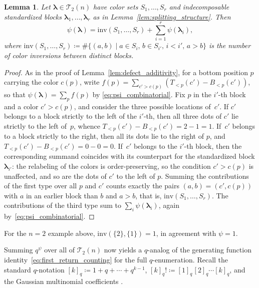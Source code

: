 \documentclass[10pt,a4paper]{amsart}
\numberwithin{equation}{section}
\newcommand{\ssp}{\hspace{1pt}}
\newtheorem{Lemma}[Theorem]{Lemma}
\theoremstyle{definition}
\begin{document}
\begin{Lemma}
	\label{lem:psi_crossterm}
	Let $\boldsymbol\lambda\in\mathcal{T}_2(n)$ have color sets
	$S_1,\dots,S_r$ and indecomposable standardized blocks
	$\boldsymbol\lambda_1,\dots,\boldsymbol\lambda_r$ as in
	Lemma~{\rm \ref{lem:splitting_structure}}.
	Then
	\begin{equation*}%
		\psi(\boldsymbol\lambda)
		=\mathrm{inv}(S_1,\dots,S_r)
		+\sum_{i=1}^{r}\psi(\boldsymbol\lambda_i),
	\end{equation*}
	where
	$\mathrm{inv}(S_1,\dots,S_r)
	\coloneqq
	\# \{(a,b)\mid a\in S_i,\, b\in S_{i'},\, i<i',\, a>b \}$
	is the number of color inversions between distinct blocks.
\end{Lemma}
\begin{proof}
	As in the proof of Lemma~\ref{lem:defect_additivity}, for a bottom position
	$p$ carrying the color $c(p)$, write
	$f(p)=\sum_{c'>c(p)} (T_{<p}(c')-B_{<p}(c') )$, so that
	$\psi(\boldsymbol\lambda)=\sum_{p}f(p)$ by
	\eqref{eq:psi_combinatorial}.
	Fix $p$ in the $i'$-th block and a color $c'>c(p)$, and consider the
	three possible locations of~$c'$.
	If $c'$ belongs to a block strictly to the left of the $i'$-th, then
	all three dots of $c'$ lie strictly to the left of~$p$, whence
	$T_{<p}(c')-B_{<p}(c')=2-1=1$.
	If~$c'$ belongs to a block strictly to the right, then all its dots
	lie to the right of $p$, and $T_{<p}(c')-B_{<p}(c')=0-0=0$.
	If~$c'$ belongs to the $i'$-th block, then the corresponding summand
	coincides with its counterpart for the standardized block
	$\boldsymbol\lambda_{i'}$: the relabeling of the colors is
	order-preserving, so the condition $c'>c(p)$ is unaffected, and so are
	the dots of $c'$ to the left of $p$.
	Summing the contributions of the first type over all $p$ and $c'$
	counts exactly the pairs $(a,b)=(c',c(p))$ with $a$ in an earlier
	block than $b$ and $a>b$, that is, $\mathrm{inv}(S_1,\dots,S_r)$.
	The contributions of the third type sum to
	$\sum_{i}\psi(\boldsymbol\lambda_i)$, again by~\eqref{eq:psi_combinatorial}.
\end{proof}

For the $n=2$ example above, $\mathrm{inv}(\{2\},\{1\})=1$, in agreement
with $\psi=1$.

Summing $q^{\psi}$ over all of $\mathcal{T}_2(n)$ now yields a $q$-analog
of the generating function identity~\eqref{eq:first_return_counting} for the
full $q$-enumeration.
Recall the standard $q$-notation
$[k]_q\coloneqq 1+q+\cdots+q^{k-1}$,
$[k]_q!\coloneqq[1]_q\ssp[2]_q\cdots[k]_q$, and the Gaussian multinomial
coefficients
.
\end{document}
